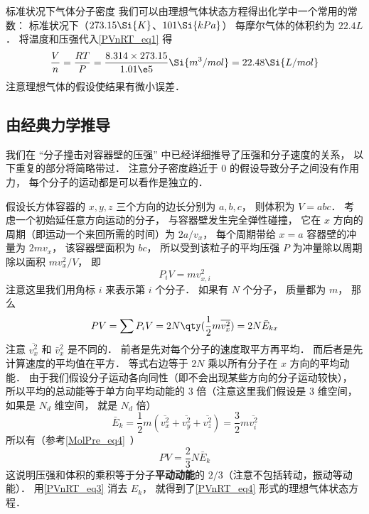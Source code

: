 \begin{example}{标准状况下气体分子密度}
我们可以由理想气体状态方程得出化学中一个常用的常数： 标准状况下（$273.15 \Si{K}$、$101 \Si{kPa}$） 每摩尔气体的体积约为 $22.4L$． 将温度和压强代入\autoref{PVnRT_eq1} 得
\begin{equation}
\frac{V}{n} = \frac{RT}{P} = \frac{8.314 \times 273.15}{1.01\e5}\Si{m^3/mol} = 22.48 \Si{L/mol}
\end{equation}
注意理想气体的假设使结果有微小误差．
\end{example}

\subsection{由经典力学推导}

我们在 “分子撞击对容器壁的压强” 中已经详细推导了压强和分子速度的关系， 以下重复的部分将简略带过． 注意分子密度趋近于 0 的假设导致分子之间没有作用力， 每个分子的运动都是可以看作是独立的．

假设长方体容器的 $x, y, z$ 三个方向的边长分别为 $a, b, c$， 则体积为  $V = abc$． 考虑一个初始延任意方向运动的分子， 与容器壁发生完全弹性碰撞， 它在 $x$ 方向的周期（即运动一个来回所需的时间）为 $2a/v_x$， 每个周期带给 $x = a$ 容器壁的冲量为 $2m v_x$， 该容器壁面积为 $bc$， 所以受到该粒子的平均压强 $P$ 为冲量除以周期除以面积 $mv_x^2/V$， 即
\begin{equation}
P_i V = mv_{x,i}^2
\end{equation}
注意这里我们用角标 $i$ 来表示第 $i$ 个分子． 如果有 $N$ 个分子， 质量都为 $m$， 那么
\begin{equation}
P V = \sum P_i V = 2 N \qty(\frac12 m \overline {v_x^2}) = 2 N \bar E_{kx}
\end{equation}
注意 $\overline {v_x^2}$ 和 $\bar v_x^2$ 是不同的． 前者是先对每个分子的速度取平方再平均． 而后者是先计算速度的平均值在平方． 等式右边等于 $2N$ 乘以所有分子在 $x$ 方向的平均动能． 由于我们假设分子运动各向同性（即不会出现某些方向的分子运动较快）， 所以平均的总动能等于单方向平均动能的 3 倍（注意这里我们假设是 3 维空间， 如果是 $N_d$ 维空间， 就是 $N_d$ 倍）
\begin{equation}
\bar E_k = \frac{1}{2} m (\overline {v_x^2} + \overline {v_y^2} + \overline {v_z^2}) = \frac{3}{2} m \overline {v_i^2}
\end{equation}
所以有（参考\autoref{MolPre_eq4}~）
\begin{equation}
P V = \frac23 N \bar E_k
\end{equation}
这说明压强和体积的乘积等于分子\textbf{平动动能}的 $2/3$（注意不包括转动，振动等动能）． 用\autoref{PVnRT_eq3} 消去 $E_k$， 就得到了\autoref{PVnRT_eq4} 形式的理想气体状态方程．

